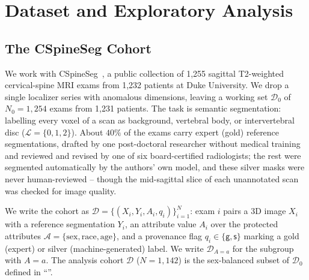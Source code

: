 \section{Dataset and Exploratory Analysis}
\label{sec:dataset}

\subsection{The CSpineSeg Cohort}
\label{sec:cohort}

We work with CSpineSeg~\cite{zhou2025cspineseg}, a public collection of 1,255
sagittal T2-weighted cervical-spine MRI exams from 1,232 patients at Duke
University. We drop a single localizer series with anomalous dimensions, leaving a
working set $\mathcal{D}_0$ of $N_0 = 1{,}254$ exams from 1,231 patients. The task
is semantic segmentation: labelling every voxel of a scan as background, vertebral
body, or intervertebral disc ($\mathcal{L} = \{0, 1, 2\}$).
About $40\%$ of the exams carry expert (gold) reference segmentations, drafted by one post-doctoral researcher without medical training and reviewed and revised by
one of six board-certified radiologists; the rest were segmented automatically by the authors' own model, and
these silver masks were never human-reviewed -- though the mid-sagittal slice of
each unannotated scan was checked for image quality.

We write the cohort as $\mathcal{D} = \{(X_i, Y_i, A_i, q_i)\}_{i=1}^{N}$: exam
$i$ pairs a 3D image $X_i$ with a reference segmentation $Y_i$, an attribute value
$A_i$ over the protected attributes $\mathcal{A} = \{\text{sex}, \text{race},
\text{age}\}$, and a provenance flag $q_i \in \{\mathsf{g}, \mathsf{s}\}$ marking a
gold (expert) or silver (machine-generated) label. We write
$\mathcal{D}_{A=a}$ for the subgroup with $A = a$. The analysis cohort
$\mathcal{D}$ ($N = 1{,}142$) is the sex-balanced subset of $\mathcal{D}_0$ defined
in ``''.

